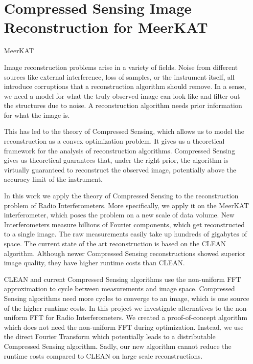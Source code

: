 \section{Compressed Sensing Image Reconstruction for MeerKAT} \label{intro}
MeerKAT

Image reconstruction problems arise in a variety of fields. Noise from different sources like external interference, loss of samples, or the instrument itself, all introduce corruptions that a reconstruction algorithm should remove. In a sense, we need a model for what the truly observed image can look like and filter out the structures due to noise. A reconstruction algorithm needs prior information for what the image is. 

This has led to the theory of Compressed Sensing\cite{candes2006robust, donoho2006compressed}, which allows us to model the reconstruction as a convex optimization problem. It gives us a theoretical framework for the analysis of reconstruction algorithms. Compressed Sensing gives us theoretical guarantees that, under the right prior, the algorithm is virtually guaranteed to reconstruct the observed image, potentially above the accuracy limit of the instrument.

In this work we apply the theory of Compressed Sensing to the reconstruction problem of Radio Interferometers. More specifically, we apply it on the MeerKAT interferometer, which poses the problem on a new scale of data volume. New Interferometers measure billions of Fourier components, which get reconstructed to a single image. The raw measurements easily take up hundreds of gigabytes of space. The current state of the art reconstruction is based on the CLEAN\cite{rich2008multi, rau2011multi} algorithm. Although newer Compressed Sensing reconstructions showed superior image quality\cite{girard2015sparse, dabbech2018cygnus}, they have higher runtime costs than CLEAN.

CLEAN and current Compressed Sensing algorithms use the non-uniform FFT approximation\cite{kunisnonequispaced, pratley2017robust} to cycle between measurements and image space. Compressed Sensing algorithms need more cycles to converge to an image, which is one source of the higher runtime costs. In this project we investigate alternatives to the non-uniform FFT for Radio Interferometers. We created a proof-of-concept algorithm which does not need the non-uniform FFT during optimization. Instead, we use the direct Fourier Transform which potentially leads to a distributable Compressed Sensing algorithm. Sadly, our new algorithm cannot reduce the runtime costs compared to CLEAN on large scale reconstructions. 

